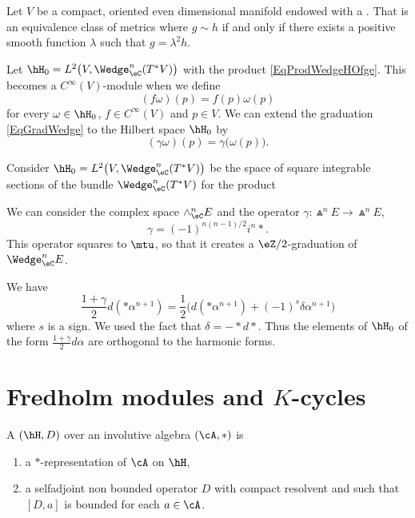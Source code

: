 Let $V$ be a compact, oriented even dimensional manifold endowed with a . That is an equivalence class of metrics where $g\sim h$ if and only if there exists a positive smooth function $\lambda$ such that $g=\lambda^2 h$.

Let $\hH_0=L^2\big( V,\Wedge^n_{\eC}(T^*V) \big)$ with the product \eqref{EqProdWedgeHOfge}. This becomes a $ C^{\infty}(V)$-module when we define
\begin{equation}
	(f\omega)(p)=f(p)\omega(p)
\end{equation}
for every $\omega\in\hH_0$, $f\in C^{\infty}(V)$ and $p\in V$. We can extend the graduation \eqref{EqGradWedge} to the Hilbert space $\hH_0$ by
\begin{equation}
	(\gamma\omega)(p)=\gamma\big( \omega(p) \big).
\end{equation}


Consider $\hH_0=L^2\big( V,\Wedge^n_{\eC}(T^*V) \big)$ be the space of square integrable sections of the bundle $\Wedge^n_{\eC}(T^*V)$ for the product

We can consider the complex space $\wedge^n_{\eC}E$ and the operator $\gamma\colon \Wedge^nE\to \Wedge^nE$,
\begin{equation}
	\gamma=(-1)^{n(n-1)/2}i^n *.
\end{equation}
This operator squares to $\mtu$, so that it creates a $\eZ/2$-graduation of $\Wedge^n_{\eC}E$.

We have
\begin{equation}
	\frac{ 1+\gamma }{2}d(*\alpha^{n+1})=\frac{ 1 }{2}\Big( d(*\alpha^{n+1})+(-1)^s\delta\alpha^{n+1} \Big)
\end{equation}
where $s$ is a sign. We used the fact that $\delta=-*d*$. Thus the elements of $\hH_0$ of the form $\frac{ 1+\gamma }{2}d\alpha$ are orthogonal to the harmonic forms.


\section{Fredholm modules and $K$-cycles}

\begin{definition}
	A  $(\hH,D)$ over an involutive algebra $(\cA,*)$ is
	\begin{enumerate}
		\item a $*$-representation of $\cA$ on $\hH$,
		\item a selfadjoint non bounded operator $D$ with compact resolvent and such that $[D,a]$ is bounded for each $a\in\cA$.
	\end{enumerate}
\end{definition}

